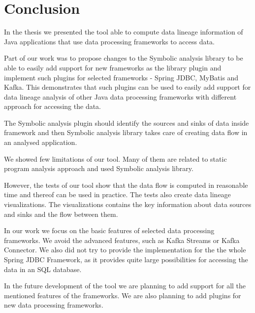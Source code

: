 
\chapter{Conclusion}

In the thesis we presented the \ToolName tool able to compute
data lineage information of Java applications that use data processing
frameworks to access data.

Part of our work was to propose changes to the Symbolic analysis library
to be able to easily add support for new frameworks as the library plugin
and implement such plugins for selected frameworks - Spring JDBC, MyBatis and Kafka.
This demonstrates that such plugins can be used to easily add
support for data lineage analysis of other Java data processing frameworks
with different approach for accessing the data.

The Symbolic analysis plugin should identify the sources and sinks of
data inside framework and then Symbolic analysis library takes care of
creating data flow in an analysed application.

We showed few limitations of our \ToolName tool. Many of them
are related to static program analysis approach and used
Symbolic analysis library.

However, the tests of our \ToolName tool show that the data flow is
computed in reasonable time and thereof can be used in practice.
The tests also create data lineage visualizations.
The visualizations contains the key information about
data sources and sinks and the flow between them.

In our work we focus on the basic features of selected data processing frameworks.
We avoid the advanced features, such as Kafka Streams or Kafka Connector.
We also did not try to provide the implementation for the the whole Spring JDBC Framework,
as it provides quite large possibilities for accessing the data in an SQL database.

In the future development of the \ToolName tool we are planning to add support
for all the mentioned features of the frameworks.
We are also planning to add plugins for new data processing frameworks.



